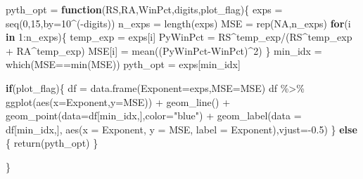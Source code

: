 \documentclass[
  11pt,
]{book}
\newenvironment{Shaded}{\begin{snugshade}}{\end{snugshade}}
\newcommand{\AttributeTok}[1]{\textcolor[rgb]{0.77,0.63,0.00}{#1}}
\newcommand{\ConstantTok}[1]{\textcolor[rgb]{0.00,0.00,0.00}{#1}}
\newcommand{\ControlFlowTok}[1]{\textcolor[rgb]{0.13,0.29,0.53}{\textbf{#1}}}
\newcommand{\DecValTok}[1]{\textcolor[rgb]{0.00,0.00,0.81}{#1}}
\newcommand{\FloatTok}[1]{\textcolor[rgb]{0.00,0.00,0.81}{#1}}
\newcommand{\FunctionTok}[1]{\textcolor[rgb]{0.00,0.00,0.00}{#1}}
\newcommand{\NormalTok}[1]{#1}
\newcommand{\OtherTok}[1]{\textcolor[rgb]{0.56,0.35,0.01}{#1}}
\newcommand{\SpecialCharTok}[1]{\textcolor[rgb]{0.00,0.00,0.00}{#1}}
\newcommand{\StringTok}[1]{\textcolor[rgb]{0.31,0.60,0.02}{#1}}
\theoremstyle{definition}
\theoremstyle{definition}
\theoremstyle{definition}
\theoremstyle{definition}
\theoremstyle{remark}
\begin{document}
\begin{Shaded}
\begin{Highlighting}[]
\NormalTok{pyth\_opt }\OtherTok{=} \ControlFlowTok{function}\NormalTok{(RS,RA,WinPct,digits,plot\_flag)\{}
\NormalTok{  exps }\OtherTok{=} \FunctionTok{seq}\NormalTok{(}\DecValTok{0}\NormalTok{,}\DecValTok{15}\NormalTok{,}\AttributeTok{by=}\DecValTok{10}\SpecialCharTok{\^{}}\NormalTok{(}\SpecialCharTok{{-}}\NormalTok{digits))}
\NormalTok{  n\_exps }\OtherTok{=} \FunctionTok{length}\NormalTok{(exps)}
\NormalTok{  MSE }\OtherTok{=} \FunctionTok{rep}\NormalTok{(}\ConstantTok{NA}\NormalTok{,n\_exps)}
  \ControlFlowTok{for}\NormalTok{(i }\ControlFlowTok{in} \DecValTok{1}\SpecialCharTok{:}\NormalTok{n\_exps)\{}
\NormalTok{    temp\_exp }\OtherTok{=}\NormalTok{ exps[i]}
\NormalTok{    PyWinPct }\OtherTok{=}\NormalTok{ RS}\SpecialCharTok{\^{}}\NormalTok{temp\_exp}\SpecialCharTok{/}\NormalTok{(RS}\SpecialCharTok{\^{}}\NormalTok{temp\_exp }\SpecialCharTok{+}\NormalTok{ RA}\SpecialCharTok{\^{}}\NormalTok{temp\_exp)}
\NormalTok{    MSE[i] }\OtherTok{=} \FunctionTok{mean}\NormalTok{((PyWinPct}\SpecialCharTok{{-}}\NormalTok{WinPct)}\SpecialCharTok{\^{}}\DecValTok{2}\NormalTok{)}
\NormalTok{  \}}
\NormalTok{  min\_idx }\OtherTok{=} \FunctionTok{which}\NormalTok{(MSE}\SpecialCharTok{==}\FunctionTok{min}\NormalTok{(MSE))}
\NormalTok{  pyth\_opt }\OtherTok{=}\NormalTok{ exps[min\_idx]}
  
  \ControlFlowTok{if}\NormalTok{(plot\_flag)\{}
\NormalTok{    df }\OtherTok{=} \FunctionTok{data.frame}\NormalTok{(}\AttributeTok{Exponent=}\NormalTok{exps,}\AttributeTok{MSE=}\NormalTok{MSE)}
\NormalTok{    df }\SpecialCharTok{\%\textgreater{}\%} \FunctionTok{ggplot}\NormalTok{(}\FunctionTok{aes}\NormalTok{(}\AttributeTok{x=}\NormalTok{Exponent,}\AttributeTok{y=}\NormalTok{MSE)) }\SpecialCharTok{+} 
      \FunctionTok{geom\_line}\NormalTok{() }\SpecialCharTok{+} 
      \FunctionTok{geom\_point}\NormalTok{(}\AttributeTok{data=}\NormalTok{df[min\_idx,],}\AttributeTok{color=}\StringTok{"blue"}\NormalTok{)  }\SpecialCharTok{+}
      \FunctionTok{geom\_label}\NormalTok{(}\AttributeTok{data =}\NormalTok{ df[min\_idx,],}
                 \FunctionTok{aes}\NormalTok{(}\AttributeTok{x =}\NormalTok{ Exponent, }\AttributeTok{y =}\NormalTok{ MSE, }\AttributeTok{label =}\NormalTok{ Exponent),}\AttributeTok{vjust=}\SpecialCharTok{{-}}\FloatTok{0.5}\NormalTok{)}
\NormalTok{  \} }\ControlFlowTok{else}\NormalTok{ \{}
    \FunctionTok{return}\NormalTok{(pyth\_opt)}
\NormalTok{  \}}
  
\NormalTok{\}}
\end{Highlighting}
\end{Shaded}
\end{document}
